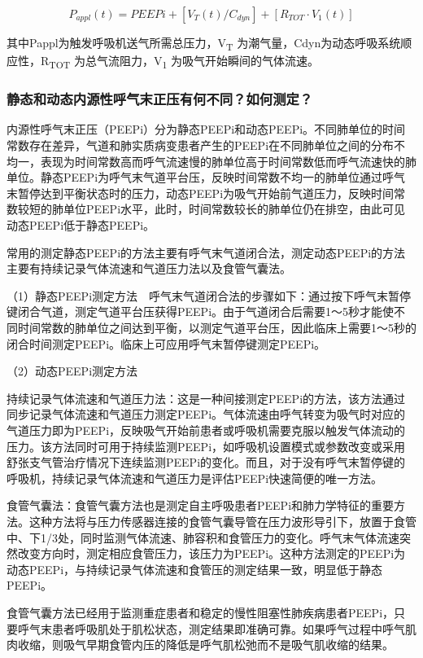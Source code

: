 \[P_{appl}(t)=PEEPi+[V_T(t)/C_{dyn}]+[R_{TOT}\cdot V_1(t)]\]

其中Pappl为触发呼吸机送气所需总压力，V\textsubscript{T}
为潮气量，Cdyn为动态呼吸系统顺应性，R\textsubscript{TOT}
为总气流阻力，V\textsubscript{1} 为吸气开始瞬间的气体流速。

\subsubsection{静态和动态内源性呼气末正压有何不同？如何测定？}

内源性呼气末正压（PEEPi）分为静态PEEPi和动态PEEPi。不同肺单位的时间常数存在差异，气道和肺实质病变患者产生的PEEPi在不同肺单位之间的分布不均一，表现为时间常数高而呼气流速慢的肺单位高于时间常数低而呼气流速快的肺单位。静态PEEPi为呼气末气道平台压，反映时间常数不均一的肺单位通过呼气末暂停达到平衡状态时的压力，动态PEEPi为吸气开始前气道压力，反映时间常数较短的肺单位PEEPi水平，此时，时间常数较长的肺单位仍在排空，由此可见动态PEEPi低于静态PEEPi。

常用的测定静态PEEPi的方法主要有呼气末气道闭合法，测定动态PEEPi的方法主要有持续记录气体流速和气道压力法以及食管气囊法。

（1）静态PEEPi测定方法　呼气末气道闭合法的步骤如下：通过按下呼气末暂停键闭合气道，测定气道平台压获得PEEPi。由于气道闭合后需要1～5秒才能使不同时间常数的肺单位之间达到平衡，以测定气道平台压，因此临床上需要1～5秒的闭合时间测定PEEPi。临床上可应用呼气末暂停键测定PEEPi。

（2）动态PEEPi测定方法

持续记录气体流速和气道压力法：这是一种间接测定PEEPi的方法，该方法通过同步记录气体流速和气道压力测定PEEPi。气体流速由呼气转变为吸气时对应的气道压力即为PEEPi，反映吸气开始前患者或呼吸机需要克服以触发气体流动的压力。该方法同时可用于持续监测PEEPi，如呼吸机设置模式或参数改变或采用舒张支气管治疗情况下连续监测PEEPi的变化。而且，对于没有呼气末暂停键的呼吸机，持续记录气体流速和气道压力是评估PEEPi快速简便的唯一方法。

食管气囊法：食管气囊方法也是测定自主呼吸患者PEEPi和肺力学特征的重要方法。这种方法将与压力传感器连接的食管气囊导管在压力波形导引下，放置于食管中、下1/3处，同时监测气体流速、肺容积和食管压力的变化。呼气末气体流速突然改变方向时，测定相应食管压力，该压力为PEEPi。这种方法测定的PEEPi为动态PEEPi，与持续记录气体流速和食管压的测定结果一致，明显低于静态PEEPi。

食管气囊方法已经用于监测重症患者和稳定的慢性阻塞性肺疾病患者PEEPi，只要呼气末患者呼吸肌处于肌松状态，测定结果即准确可靠。如果呼气过程中呼气肌肉收缩，则吸气早期食管内压的降低是呼气肌松弛而不是吸气肌收缩的结果。

